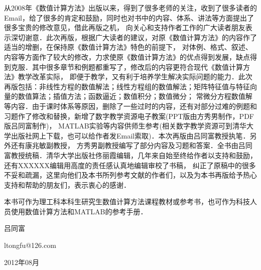  \vspace*{0.0cm}
\thispagestyle{empty}
\vspace*{2.2cm}
\centerline{\hei{\color{darkblue}{第二版前言}}}\vspace{2cm}

从2008年《数值计算方法》出版以来，得到了很多老师的关注，收到了很多读者的Email，给了很多的肯定和鼓励，同时也对书中的内容、体系、讲法等方面提出了很多宝贵的修改意见，借此再版之机，
向关心和支持作者工作的广大读者朋友表示深切谢意．此次再版，根据广大读者的建议，对原《数值计算方法》的内容作了适当的增删，在保持原《数值计算方法》特色的前提下，
对体例、格式、叙述、内容等方面作了较大的修改，力求使原《数值计算方法》的优点得到发展，缺点得到克服．其中很多章节和例题都重写了，修改后的内容更符合现代《数值计算方法》教学改革实际，
即便于教学，又有利于培养学生解决实际问题的能力．此次再版包括：非线性方程的数值解法；线性方程组的数值解法；矩阵特征值与特征向量的数值算法；插值方法；函数逼近；数值积分；数值微分；
常微分方程数值解等内容．由于课时体系等原因，删除了一些过时的内容，还有对部分过难的例题和习题作了修改和替换，新增了数字教学资源电子教案(PPT版由方秀男制作，PDF版吕同富制作)，
MATLAB实验等内容供师生参考(相关数字教学资源可到清华大学出版社网上下载，也可以给作者发Email索取)．本次再版由吕同富教授执笔．另外还有康兆敏副教授，
方秀男副教授编写了部分内容及习题和答案．全书由吕同富教授统稿．清华大学出版社佟丽霞编辑，几年来自始至终给作者以支持和鼓励，还有XXXXXX编辑用高度的责任感认真地编辑审校了书稿，
纠正了原稿中的很多不妥和疏漏，这里向他们及本书所列参考文献的作者们，以及为本书再版给予热心支持和帮助的朋友们，表示衷心的感谢．

本书可作为理工科本科生研究生数值计算方法课程教材或参考书，也可作为科技人员使用数值计算方法和MATLAB的参考手册．


\vspace{1cm}

\hfill 吕同富\hspace{0.2em}

\hfill ltongfu@126.com \hspace{0.2em}

\hfill 2012年08月\hspace{0.2em}
